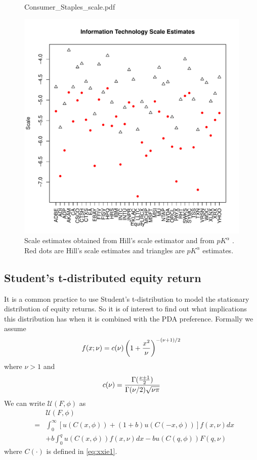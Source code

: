 \documentclass[11pt,a4]{amsart}
\newcommand{\1}{{\mathbf 1}}
\begin{document}
\begin{figure}[htb!]
\begin{minipage}{0.32\linewidth}
    {Consumer_Staples_scale.pdf}
  \end{minipage}
  \begin{minipage}{0.32\linewidth}
    \includegraphics[width=\textwidth]
    {Information_Technology_scale.pdf}
  \end{minipage}
  \caption{\small Scale estimates obtained from Hill's scale estimator
    and from $p K^\alpha$ . Red dots are Hill's scale estimates and
    triangles are $p K^\alpha$ estimates.
  }
  \label{fig:scale_estimates}
\end{figure}

\subsection{Student's t-distributed equity return}
It is a common practice to use Student's t-distribution to model the
stationary distribution of equity returns. So it is of interest to
find out what implications this distribution has when it is combined
with the PDA preference. Formally we assume
\[
f(x; \nu) = c(\nu) \left(
  1 + {x^2 \over \nu}
\right)^{-(\nu + 1)/2}
\]
where $\nu > 1$ and
\[
c(\nu) = {
  \Gamma({\nu + 1 \over 2})
  \over
  \Gamma(\nu/2) \sqrt{\nu \pi}
}
\]
We can write $\mathcal U(F, \phi)$ as
\begin{eqnarray}
  && \mathcal U(F, \phi) \nonumber \\
  &=&
  \int_{0}^{\infty}
  \left[
    u(C(x, \phi)) + (1 + b)u(C(-x, \phi))
  \right]
  f(x, \nu) dx \nonumber \\
  &&
  + b \int_{0}^{q}
  u(C(x, \phi))
  f(x, \nu) dx - b u(C(q, \phi)) F(q, \nu)
  \label{eq:t1}
\end{eqnarray}
where $C(\cdot)$ is defined in \eqref{eq:xxie1}.
\end{document}
